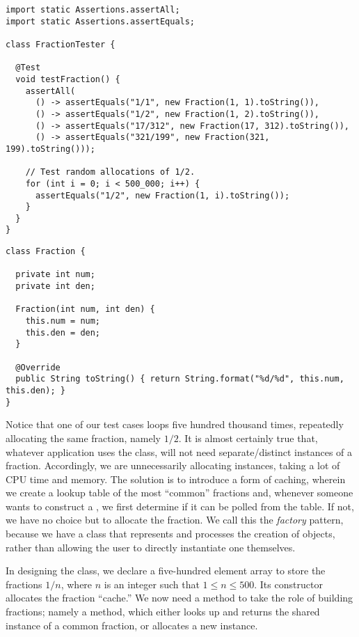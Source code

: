 \begin{cl}{}
\begin{lstlisting}[language=MyJava]
import static Assertions.assertAll;
import static Assertions.assertEquals;

class FractionTester {

  @Test
  void testFraction() {
    assertAll(
      () -> assertEquals("1/1", new Fraction(1, 1).toString()),
      () -> assertEquals("1/2", new Fraction(1, 2).toString()),
      () -> assertEquals("17/312", new Fraction(17, 312).toString()),
      () -> assertEquals("321/199", new Fraction(321, 199).toString()));

    // Test random allocations of 1/2.
    for (int i = 0; i < 500_000; i++) {
      assertEquals("1/2", new Fraction(1, i).toString());
    }
  } 
}
\end{lstlisting}
\end{cl}

\begin{cl}{}
\begin{lstlisting}[language=MyJava]
class Fraction {

  private int num;
  private int den;

  Fraction(int num, int den) {
    this.num = num;
    this.den = den;
  }

  @Override
  public String toString() { return String.format("%d/%d", this.num, this.den); }
}
\end{lstlisting}
\end{cl}

Notice that one of our test cases loops five hundred thousand times, repeatedly allocating the same fraction, namely $1/2$. It is almost certainly true that, whatever application uses the  class, will not need separate/distinct instances of a fraction. Accordingly, we are unnecessarily allocating  instances, taking a lot of CPU time and memory. The solution is to introduce a form of caching, wherein we create a lookup table of the most ``common'' fractions and, whenever someone wants to construct a , we first determine if it can be polled from the table. If not, we have no choice but to allocate the fraction. We call this the \emph{factory} pattern, because we have a class that represents and processes the creation of  objects, rather than allowing the user to directly instantiate one themselves. 

In designing the  class, we declare a five-hundred element array to store the fractions $1/n$, where $n$ is an integer such that $1 \leq n \leq 500$. Its constructor allocates the fraction ``cache.'' We now need a method to take the role of building fractions; namely a  method, which either looks up and returns the shared instance of a common fraction, or allocates a new instance.


